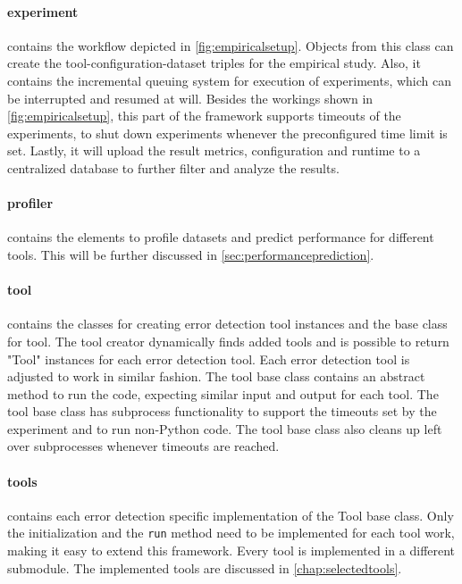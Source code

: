 \paragraph{experiment} contains the workflow depicted in \autoref{fig:empiricalsetup}. Objects from this class can create the tool-configuration-dataset triples for the empirical study. Also, it contains the incremental queuing system for execution of experiments, which can be interrupted and resumed at will. Besides the workings shown in \autoref{fig:empiricalsetup}, this part of the framework supports timeouts of the experiments, to shut down experiments whenever the preconfigured time limit is set. Lastly, it will upload the result metrics, configuration and runtime to a centralized database to further filter and analyze the results.

\paragraph{profiler} contains the elements to profile datasets and predict performance for different tools. This will be further discussed in \autoref{sec:performanceprediction}.

\paragraph{tool} contains the classes for creating error detection tool instances and the base class for tool. The tool creator dynamically finds added tools and is possible to return "Tool" instances for each error detection tool. Each error detection tool is adjusted to work in similar fashion. The tool base class contains an abstract method to run the code, expecting similar input and output for each tool. The tool base class has subprocess functionality to support the timeouts set by the experiment and to run non-Python code. The tool base class also cleans up left over subprocesses whenever timeouts are reached. 

\paragraph{tools} contains each error detection specific implementation of the Tool base class. Only the initialization and the \verb|run| method need to be implemented for each tool work, making it easy to extend this framework. Every tool is implemented in a different submodule. The implemented tools are discussed in \autoref{chap:selectedtools}.

